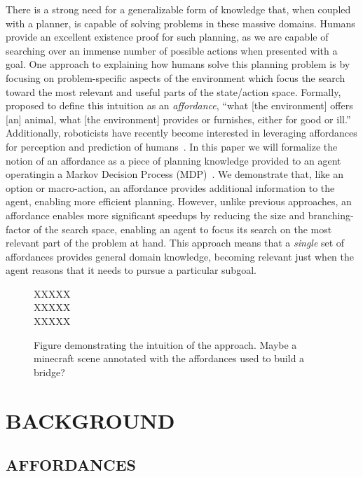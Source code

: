 \documentclass[]{article}
\begin{document}
There is a strong need for a generalizable form of knowledge that,
when coupled with a planner, is capable of solving problems in these
massive domains. Humans provide an excellent existence proof for such
planning, as we are capable of searching over an immense number of
possible actions when presented with a goal.  One approach to
explaining how humans solve this planning problem is by focusing on
problem-specific aspects of the environment which focus the search
toward the most relevant and useful parts of the state/action space.
Formally, \citet{gibson77} proposed to define this intuition as an
{\em affordance}, ``what [the environment] offers [an] animal, what
[the environment] provides or furnishes, either for good or ill.''
Additionally, roboticists have recently become interested in
leveraging affordances for perception and prediction of
humans~\citep{koppula13a, koppula13b}. In this paper we will formalize
the notion of an affordance as a piece of planning knowledge provided
to an agent operatingin a Markov Decision Process
(MDP)~\citep{kaelbling99}.  We demonstrate that, like an option or
macro-action, an affordance provides additional information to the
agent, enabling more efficient planning.  However, unlike previous
approaches, an affordance enables more significant speedups by
reducing the size and branching-factor of the search space, enabling
an agent to focus its search on the most relevant part of the problem
at hand.  This approach means that a {\em single} set of affordances
provides general domain knowledge, becoming relevant just when the
agent reasons that it needs to pursue a particular subgoal.  


\begin{figure}
\parbox{1\linewidth}{
XXXXX~\\
XXXXX~\\
XXXXX~\\
}
\caption{Figure demonstrating the intuition of the approach.  Maybe a
  minecraft scene annotated with the affordances used to build a
  bridge?\label{fig:example}}
\end{figure}

\section{BACKGROUND}



\subsection{AFFORDANCES}
\end{document}
